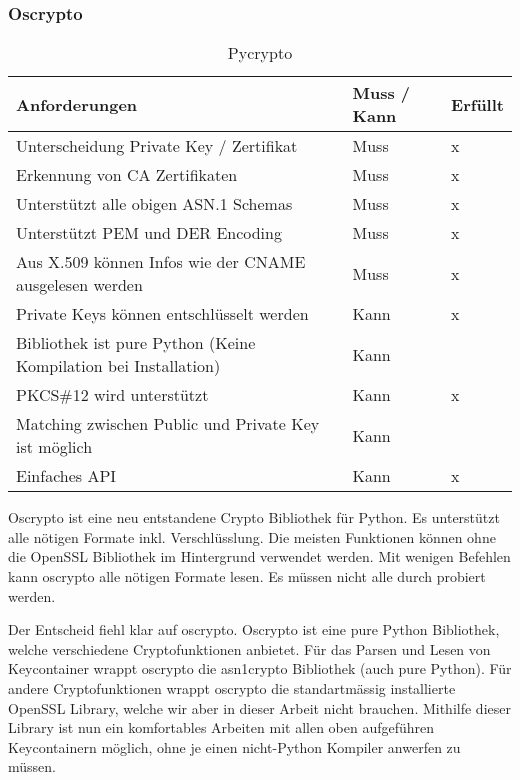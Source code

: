 \subsubsection{Oscrypto}
\begin{table}[H]
\centering
    \begin{tabular}{|p{12cm}|l|l|}
    \hline
    \rowcolor{lightblue}
    Anforderungen & Muss / Kann & Erfüllt   \\ \hline
	Unterscheidung Private Key / Zertifikat	&	Muss & x \\ \hline	
	Erkennung von CA Zertifikaten	&	Muss	& x \\ \hline	
	Unterstützt alle obigen ASN.1 Schemas	&	Muss	& x \\ \hline		
	Unterstützt PEM und DER Encoding	&	Muss	&  x \\ \hline	
	Aus X.509 können Infos wie der CNAME ausgelesen werden &	Muss	& x \\ \hline	
	Private Keys können entschlüsselt werden &	Kann &  x \\ \hline
	Bibliothek ist pure Python (Keine Kompilation bei Installation) &	Kann	&  ~ \\ \hline
	PKCS\#12 wird unterstützt &	Kann & x \\ \hline
	Matching zwischen Public und Private Key ist möglich &	Kann & ~  \\ \hline
	Einfaches API &	Kann & x \\ \hline
	\end{tabular}
    \caption[Pycrypto]{Pycrypto}
\end{table}

Oscrypto ist eine neu entstandene Crypto Bibliothek für Python. Es unterstützt alle nötigen Formate inkl. Verschlüsslung. Die meisten Funktionen können ohne die OpenSSL Bibliothek im Hintergrund verwendet werden. Mit wenigen Befehlen kann oscrypto alle nötigen Formate lesen. Es müssen nicht alle durch probiert werden.\\
\medskip

Der Entscheid fiehl klar auf oscrypto. Oscrypto ist eine pure Python Bibliothek, welche verschiedene Cryptofunktionen anbietet. Für das Parsen und Lesen von Keycontainer wrappt oscrypto die asn1crypto Bibliothek (auch pure Python). Für andere Cryptofunktionen wrappt oscrypto die standartmässig installierte OpenSSL Library, welche wir aber in dieser Arbeit nicht brauchen.
Mithilfe dieser Library ist nun ein komfortables Arbeiten mit allen oben aufgeführen Keycontainern möglich, ohne je einen nicht-Python Kompiler anwerfen zu müssen. 